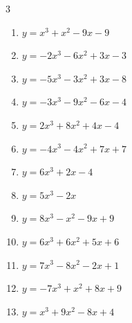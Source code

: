 \begin{multicols}{3}
\begin{enumerate}
\resetques

  \item $y=x^{3}+x^{2}-9x-9$


  \item $y=-2x^{3}-6x^{2}+3x-3$


  \item $y=-5x^{3}-3x^{2}+3x-8$


  \item $y=-3x^{3}-9x^{2}-6x-4$


  \item $y=2x^{3}+8x^{2}+4x-4$


  \item $y=-4x^{3}-4x^{2}+7x+7$


  \item $y=6x^{3}+2x-4$


  \item $y=5x^{3}-2x$


  \item $y=8x^{3}-x^{2}-9x+9$


  \item $y=6x^{3}+6x^{2}+5x+6$


  \item $y=7x^{3}-8x^{2}-2x+1$


  \item $y=-7x^{3}+x^{2}+8x+9$


  \item $y=x^{3}+9x^{2}-8x+4$


\end{enumerate}
\end{multicols}
